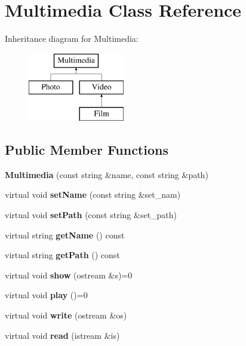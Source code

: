 \hypertarget{class_multimedia}{}\section{Multimedia Class Reference}
\label{class_multimedia}
Inheritance diagram for Multimedia\+:\begin{figure}[H]
\begin{center}
\leavevmode
\includegraphics[height=3.000000cm]{class_multimedia}
\end{center}
\end{figure}
\subsection*{Public Member Functions}
\begin{DoxyCompactItemize}
\item 
\mbox{\label{class_multimedia_a6b908a314bcdeef2b9e5c16f4ff7cdfa}} 
{\bfseries Multimedia} (const string \&name, const string \&path)
\item 
\mbox{\label{class_multimedia_abc1c5e1a28a8821d2fbd67621771a848}} 
virtual void {\bfseries set\+Name} (const string \&set\+\_\+nam)
\item 
\mbox{\label{class_multimedia_a382ab129abfddec035b5becc6439162b}} 
virtual void {\bfseries set\+Path} (const string \&set\+\_\+path)
\item 
\mbox{\label{class_multimedia_ace0804f8019ed84df1f3c18eb28cf189}} 
virtual string {\bfseries get\+Name} () const
\item 
\mbox{\label{class_multimedia_a6d8a210061b18bddc936deb9fba6e439}} 
virtual string {\bfseries get\+Path} () const
\item 
\mbox{\label{class_multimedia_a63c4c26d4960b3f4bce78cb705a9ba2d}} 
virtual void {\bfseries show} (ostream \&s)=0
\item 
\mbox{\label{class_multimedia_a61ba185d65eafe7c5e9ab38052a4ff18}} 
virtual void {\bfseries play} ()=0
\item 
\mbox{\label{class_multimedia_a9bad328813b2913e17af4b54e4acc466}} 
virtual void {\bfseries write} (ostream \&os)
\item 
\mbox{\label{class_multimedia_afe9427fcef8985a42d2facc8b814c5eb}} 
virtual void {\bfseries read} (istream \&is)
\end{DoxyCompactItemize}


